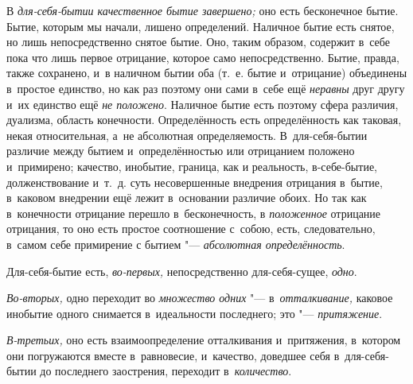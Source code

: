 В {\em для-себя-бытии качественное бытие завершено;} оно
есть бесконечное бытие. Бытие, которым мы начали, лишено определений.
Наличное бытие есть снятое, но лишь непосредственно снятое бытие. Оно,
таким образом, содержит в~себе пока что лишь первое отрицание, которое само
непосредственно. Бытие, правда, также сохранено, и~в наличном бытии оба
(т.~е. бытие и~отрицание) объединены в~простое единство, но как раз поэтому
они сами в~себе ещё {\em неравны} друг другу и~их
единство ещё {\em не положено}. Наличное бытие есть
поэтому сфера различия, дуализма, область конечности. Определённость
есть определённость как таковая, некая относительная, а~не абсолютная
определяемость. В~для-себя-бытии различие между бытием и~определённостью
или отрицанием положено и~примирено; качество, инобытие, граница, как и
реальность, в-себе-бытие, долженствование и~т.~д. суть несовершенные
внедрения отрицания в~бытие, в~каковом внедрении ещё лежит в~основании
различие обоих. Но так как в~конечности отрицание перешло в~бесконечность,
в {\em положенное} отрицание отрицания, то оно есть
простое соотношение с~собою, есть, следовательно, в~самом себе примирение с
бытием "--- {\em абсолютная определённость}.

Для-себя-бытие есть, {\em во-первых,} непосредственно
для-себя-сущее, {\em одно}.

{\em Во-вторых,} одно переходит во {\em множество одних} "---
в~{\em отталкивание,} каковое инобытие одного снимается
в~идеальности последнего; это "--- {\em притяжение}.

{\em В-третьих,} оно есть взаимоопределение отталкивания и~притяжения,
в~котором они погружаются вместе в~равновесие, и~качество, доведшее себя
в~для-себя-бытии до последнего заострения, переходит в~{\em количество}.


